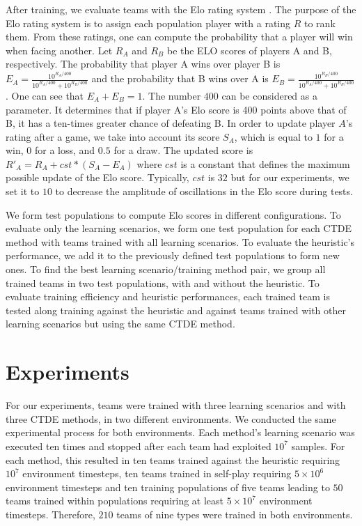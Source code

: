 After training, we evaluate teams with the Elo rating system \citep{elo1978rating}.
The purpose of the Elo rating system is to assign each population player with a rating $R$ to rank them.
From these ratings, one can compute the probability that a player will win when facing another.
Let $R_A$ and $R_B$ be the ELO scores of players A and B, respectively.
The probability that player A wins over player B is $E_A=\frac{10^{R_A/400}}{10^{R_A/400} + 10^{R_B/400}}$ and the probability that B wins over A is $E_B=\frac{10^{R_B/400}}{10^{R_A/400} + 10^{R_B/400}}$.
One can see that $E_A + E_B = 1$.
The number $400$ can be considered as a parameter.
It determines that if player A's Elo score is 400 points above that of B, it has a ten-times greater chance of defeating B.
In order to update player $A$'s rating after a game, we take into account its score $S_A$, which is equal to $1$ for a win, $0$ for a loss, and $0.5$ for a draw.
The updated score is $R'_A = R_A + cst * (S_A - E_A)$ where $cst$ is a constant that defines the maximum possible update of the Elo score.
Typically, $cst$ is $32$ but for our experiments, we set it to $10$ to decrease the amplitude of oscillations in the Elo score during tests.

We form test populations to compute Elo scores in different configurations.
To evaluate only the learning scenarios, we form one test population for each CTDE method with teams trained with all learning scenarios.
To evaluate the heuristic's performance, we add it to the previously defined test populations to form new ones.
To find the best learning scenario/training method pair, we group all trained teams in two test populations, with and without the heuristic.
To evaluate training efficiency and heuristic performances, each trained team is tested along training against the heuristic and against teams trained with other learning scenarios but using the same CTDE method.

\section{Experiments} \label{sec:ch7_experiments}

For our experiments, teams were trained with three learning scenarios and with three CTDE methods, in two different environments.
We conducted the same experimental process for both environments.
Each method's learning scenario was executed ten times and stopped after each team had exploited $10^7$ samples.
For each method, this resulted in ten teams trained against the heuristic requiring $10^7$ environment timesteps, ten teams trained in self-play requiring $5\times10^6$ environment timesteps and ten training populations of five teams leading to $50$ teams trained within populations requiring at least $5\times10^7$ environment timesteps.
Therefore, $210$ teams of nine types were trained in both environments.

